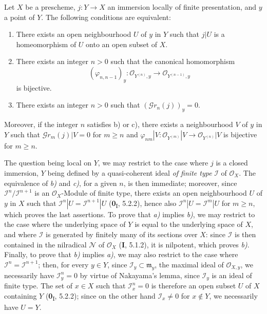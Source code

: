 \begin{proposition}[16.1.9]
\label{IV.16.1.9}
Let $X$ be a prescheme, $j:Y\to X$ an immersion locally of finite
presentation, and $y$ a point of $Y$. The following conditions are equivalent:
\begin{enumerate}
\item[\textup{a)}] There exists an open neighbourhood $U$ of $y$ in $Y$ such that $j|U$ is
a homeomorphism of $U$ onto an open subset of $X$.
\item[\textup{b)}] There exists an integer $n>0$ such that the canonical homomorphism
\[
  (\varphi_{n,n-1})_y:
  \mathcal{O}_{Y^{(n)},y}\longrightarrow\mathcal{O}_{Y^{(n-1)},y}
\]
is bijective.
\item[\textup{c)}] There exists an integer $n>0$ such that
$(\mathscr{G}r_n(j))_y=0$.
\end{enumerate}
Moreover, if the integer $n$ satisfies \textup{b)} or \textup{c)}, there exists a neighbourhood $V$ of $y$
in $Y$ such that $\mathscr{G}r_m(j)|V=0$ for $m\geq n$ and
$\varphi_{nm}|V:\mathcal{O}_{Y^{(m)}}|V\to\mathcal{O}_{Y^{(n)}}|V$ is
bijective for $m\geq n$.
\end{proposition}

The question being local on $Y$, we may restrict to the case where $j$ is a
closed immersion, $Y$ being defined by a quasi-coherent ideal \emph{of finite type}
$\mathscr{I}$ of $\mathcal{O}_X$. The equivalence of \emph{b)} and \emph{c)}, for a given $n$,
is then immediate; moreover, since
$\mathscr{I}^n/\mathscr{I}^{n+1}$ is an $\mathcal{O}_X$-Module of finite type,
there exists an open neighbourhood $U$ of $y$ in $X$ such that
$\mathscr{I}^n|U=\mathscr{I}^{n+1}|U$ (\textbf{0}\textsubscript{I}, 5.2.2), hence also
$\mathscr{I}^n|U=\mathscr{I}^m|U$ for $m\geq n$, which proves the last
assertions. To prove that \emph{a)} implies \emph{b)}, we may restrict to the case where
the underlying space of $Y$ is equal to the underlying space of $X$, and where
$\mathscr{I}$ is generated by finitely many of its sections over $X$:
since $\mathscr{I}$ is then contained in the nilradical $\mathscr{N}$ of
$\mathcal{O}_X$ (\textbf{I}, 5.1.2), it is nilpotent, which proves \emph{b)}. Finally, to
prove that \emph{b)} implies \emph{a)}, we may also restrict to the case where
$\mathscr{I}^n=\mathscr{I}^{n+1}$; then, for every $y\in Y$, since
$\mathscr{I}_y\subset\mathfrak{m}_y$, the maximal ideal of
$\mathcal{O}_{X,y}$, we necessarily have $\mathscr{I}_y^n=0$ by virtue of
Nakayama's lemma, since $\mathscr{I}_y$ is an ideal of finite type.
The set of $x\in X$ such that $\mathscr{I}_x^n=0$ is therefore an open subset $U$ of
$X$ containing $Y$ (\textbf{0}\textsubscript{I}, 5.2.2); since on the other hand
$\mathscr{I}_x\neq 0$ for $x\notin Y$, we necessarily have $U=Y$.

